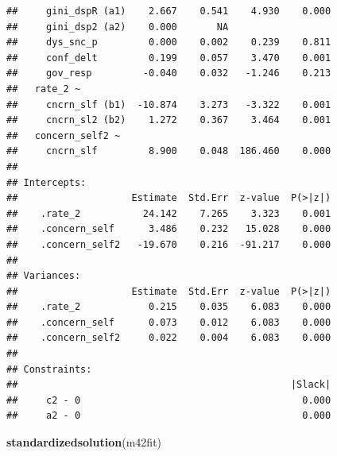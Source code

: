 \documentclass[
]{article}
\newenvironment{Shaded}{\begin{snugshade}}{\end{snugshade}}
\newcommand{\KeywordTok}[1]{\textcolor[rgb]{0.13,0.29,0.53}{\textbf{#1}}}
\newcommand{\NormalTok}[1]{#1}
\begin{document}
\begin{verbatim}
##     gini_dspR (a1)    2.667    0.541    4.930    0.000
##     gini_dsp2 (a2)    0.000       NA                  
##     dys_snc_p         0.000    0.002    0.239    0.811
##     conf_delt         0.199    0.057    3.470    0.001
##     gov_resp         -0.040    0.032   -1.246    0.213
##   rate_2 ~                                            
##     cncrn_slf (b1)  -10.874    3.273   -3.322    0.001
##     cncrn_sl2 (b2)    1.272    0.367    3.464    0.001
##   concern_self2 ~                                     
##     cncrn_slf         8.900    0.048  186.460    0.000
## 
## Intercepts:
##                    Estimate  Std.Err  z-value  P(>|z|)
##    .rate_2           24.142    7.265    3.323    0.001
##    .concern_self      3.486    0.232   15.028    0.000
##    .concern_self2   -19.670    0.216  -91.217    0.000
## 
## Variances:
##                    Estimate  Std.Err  z-value  P(>|z|)
##    .rate_2            0.215    0.035    6.083    0.000
##    .concern_self      0.073    0.012    6.083    0.000
##    .concern_self2     0.022    0.004    6.083    0.000
## 
## Constraints:
##                                                |Slack|
##     c2 - 0                                       0.000
##     a2 - 0                                       0.000
\end{verbatim}

\begin{Shaded}
\begin{Highlighting}[]
\KeywordTok{standardizedsolution}\NormalTok{(m42fit)}
\end{Highlighting}
\end{Shaded}
\end{document}
